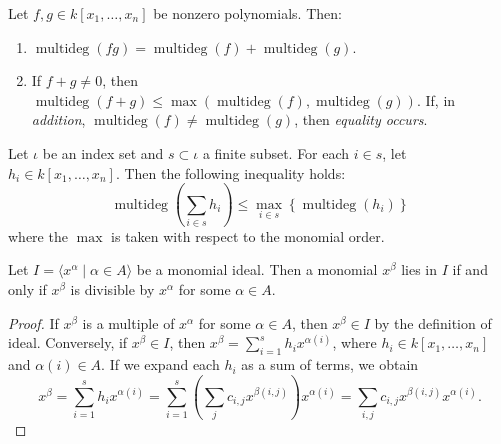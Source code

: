 \begin{lemma}\label{lem:degree_sum_le} %
  \leanok %
  Let $f, g \in k[x_1, \dots, x_n]$ be nonzero polynomials. Then:
  \begin{enumerate}
      \item $\operatorname{multideg}(fg) = \operatorname{multideg}(f) + \operatorname{multideg}(g)$.
      \item If $f + g \neq 0$, then $\operatorname{multideg}(f + g) \le \max(\operatorname{multideg}(f), \operatorname{multideg}(g))$. 
        If, in \textit{addition}, $\operatorname{multideg}(f) \neq \operatorname{multideg}(g)$, then \textit{equality occurs}.
  \end{enumerate}
\end{lemma}

\begin{lemma}\label{lem:degree_sum_le_syn}
  \leanok %
  Let $\iota$ be an index set and $s \subset \iota$ a finite subset. For each $i \in s$, let $h_i \in k[x_1,\dots,x_n]$. 
  Then the following inequality holds:
  \[
  \operatorname{multideg}\left(\sum_{i \in s} h_i\right) \le \max_{i \in s} \left\{ \operatorname{multideg}(h_i) \right\}
  \]
  where the $\max$ is taken with respect to the monomial order.
\end{lemma}

\begin{lemma}\label{lem:mem_monomialIdeal_iff_divisible} %
    \leanok %
    Let $I = \langle x^\alpha \mid \alpha \in A \rangle$ be a monomial ideal.
    Then a monomial $x^\beta$ lies in $I$ if and only if $x^\beta$ is divisible by $x^\alpha$ for some $\alpha \in A$.
\end{lemma}
\begin{proof}
  \leanok
  If $x^\beta$ is a multiple of $x^\alpha$ for some $\alpha \in A$, then $x^\beta \in I$ by the definition of ideal. 
  Conversely, if $x^\beta \in I$, then $x^\beta = \sum_{i=1}^s h_i x^{\alpha(i)}$, where $h_i \in k[x_1, \dots, x_n]$ and $\alpha(i) \in A$. 
  If we expand each $h_i$ as a sum of terms, we obtain
  \[
  x^\beta = \sum_{i=1}^s h_i x^{\alpha(i)} = \sum_{i=1}^s \left(\sum_j c_{i,j} x^{\beta(i,j)}\right) x^{\alpha(i)} = \sum_{i,j} c_{i,j} x^{\beta(i,j)} x^{\alpha(i)}.
  \]
\end{proof}

